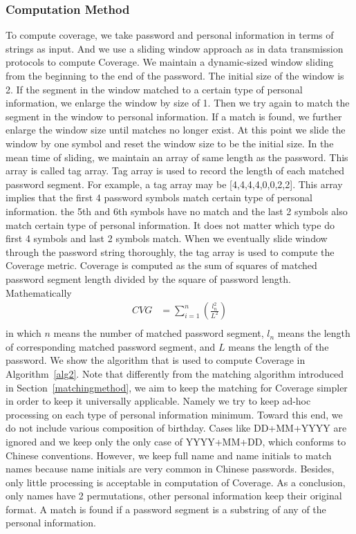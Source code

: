 \documentclass{sig-alternate}
\begin{document}
\subsubsection{Computation Method}
\label{computationmethod}
To compute coverage, we take password and personal information in terms of strings as input. And we use a sliding window approach as in data transmission protocols to compute Coverage. We maintain a dynamic-sized window sliding from the beginning to the end of the password. The initial size of the window is 2. If the segment in the window matched to a certain type of personal information, we enlarge the window by size of 1. Then we try again to match the segment in the window to personal information. If a match is found, we further enlarge the window size until matches no longer exist. At this point we slide the window by one symbol and reset the window size to be the initial size. In the mean time of sliding, we maintain an array of same length as the password. This array is called tag array. Tag array is used to record the length of each matched password segment. For example, a tag array may be [4,4,4,4,0,0,2,2]. This array implies that the first 4 password symbols match certain type of personal information. the 5th and 6th symbols have no match and the last 2 symbols also match certain type of personal information. It does not matter which type do first 4 symbols and last 2 symbols match. When we eventually slide window through the password string thoroughly, the tag array is used to compute the Coverage metric. Coverage is computed as the sum of squares of matched password segment length divided by the square of password length. Mathematically
\begin{equation} \label{eq1}
\begin{split}
CVG & = \sum_{i=1}^n (\frac{l_n^2}{L^2}) \\
\end{split}
\end{equation}
in which $n$ means the number of matched password segment, $l_n$ means the length of corresponding matched password segment, and $L$ means the length of the password. We show the algorithm that is used to compute Coverage in Algorithm~\ref{alg2}. Note that differently from the matching algorithm introduced in Section~\ref{matchingmethod}, we aim to keep the matching for Coverage simpler in order to keep it universally applicable. Namely we try to keep ad-hoc processing on each type of personal information minimum. Toward this end, we do not include various composition of birthday. Cases like DD+MM+YYYY are ignored and we keep only the only case of YYYY+MM+DD, which conforms to Chinese conventions. However, we keep full name and name initials to match names because name initials are very common in Chinese passwords. Besides, only little processing is acceptable in computation of Coverage. As a conclusion, only names have 2 permutations, other personal information keep their original format. A match is found if a password segment is a substring of any of the personal information.
\end{document}
